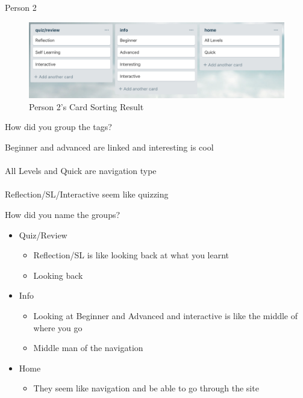 \begin{note}{Person 2}
	\begin{figure}[H]
		\centering
		\includegraphics[width=\linewidth]{card2}	
		\caption{Person 2's Card Sorting Result}
	\end{figure}

	How did you group the tags?
	\begin{leftbar}
		Beginner and advanced are linked and interesting is cool\\\\
		All Levels and Quick are navigation type\\\\
		Reflection/SL/Interactive seem like quizzing	
	\end{leftbar}
	
	How did you name the groups?
	\begin{leftbar}
		\begin{itemize}
			\item Quiz/Review
			\begin{itemize}
				\item Reflection/SL is like looking back at what you learnt
				\item Looking back
			\end{itemize}
			\item Info
			\begin{itemize}
				\item Looking at Beginner and Advanced and interactive is like the middle of where you go
				\item Middle man of the navigation
			\end{itemize}
			\item Home
			\begin{itemize}
				\item They seem like navigation and be able to go through the site
			\end{itemize}
		\end{itemize}
	\end{leftbar}
\end{note}

